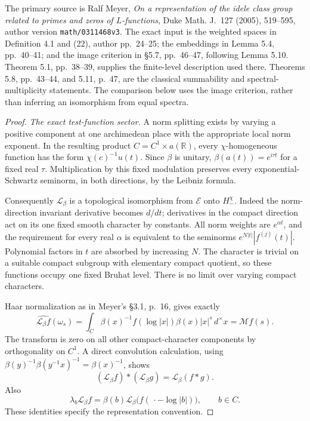 The primary source is Ralf Meyer, \emph{On a representation
of the idele class group related to primes and zeros of
\(L\)-functions}, Duke Math. J.~127 (2005), 519--595,
author version \texttt{math/0311468v3}.
The exact input is the weighted spaces in Definition 4.1
and (22), author pp.~24--25; the embeddings in Lemma 5.4,
pp.~40--41; and the image criterion in \S5.7, pp.~46--47,
following Lemma 5.10.  Theorem 5.1, pp.~38--39, supplies
the finite-level description used there.
Theorems 5.8, pp.~43--44, and 5.11, p.~47, are the
classical summability and spectral-multiplicity statements.
The comparison below uses the image criterion,
rather than inferring an isomorphism from equal spectra.

\begin{proof}
\emph{The exact test-function sector.}
A norm splitting exists by varying a positive component
at one archimedean place with the appropriate local
norm exponent.  In the resulting product
\(C=C^1\times a(\mathbb R)\), every \(\chi\)-homogeneous
function has the form \(\chi(c)^{-1}u(t)\).
Since \(\beta\) is unitary,
\(\beta(a(t))=e^{i\tau t}\) for a fixed real \(\tau\).
Multiplication by this fixed modulation preserves
every exponential-Schwartz seminorm, in both
directions, by the Leibniz formula.

Consequently \(\mathcal L_\beta\) is a topological
isomorphism from \(\mathcal E\) onto \(H_-^\chi\).
Indeed the norm-direction invariant derivative becomes
\(d/dt\); derivatives in the compact direction act
on its one fixed smooth character by constants.
All norm weights are \(e^{\alpha t}\), and the
requirement for every real \(\alpha\) is equivalent
to the seminorms \(e^{N|t|}|f^{(j)}(t)|\).
Polynomial factors in \(t\) are absorbed by increasing
\(N\).  The character is trivial on a suitable
compact subgroup with elementary compact quotient,
so these functions occupy one fixed Bruhat level.
There is no limit over varying compact characters.

Haar normalization as in Meyer's \S3.1, p.~16,
gives exactly
\[
 \widehat{\mathcal L_\beta f}(\omega_s)
       =\int_C\beta(x)^{-1}f(\log|x|)
                      \beta(x)|x|^s\,d^\times x
       =\mathcal Mf(s).                                        \tag{M22.3}
\]
The transform is zero on all other compact-character
components by orthogonality on \(C^1\).
A direct convolution calculation, using
\(\beta(y)^{-1}\beta(y^{-1}x)^{-1}=\beta(x)^{-1}\),
shows
\[
  (\mathcal L_\beta f)*(\mathcal L_\beta g)
                         =\mathcal L_\beta(f*g).
\]
Also
\[
 \lambda_b\mathcal L_\beta f
   =\beta(b)\mathcal L_\beta
         \bigl(f(\,\cdot-\log|b|)\bigr),\qquad b\in C.            \tag{M22.4}
\]
These identities specify the representation convention.


\end{proof}
